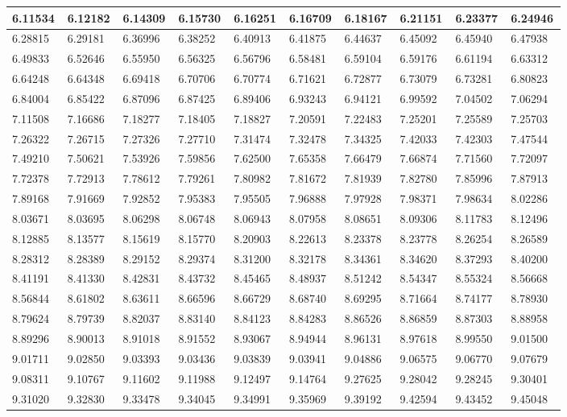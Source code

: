 \begin{changemargin}{-4cm}{0cm}\small{%
\begin{tabular}{|p{0.08\linewidth}|p{0.08\linewidth}|p{0.08\linewidth}|p{0.08\linewidth}|p{0.08\linewidth}|p{0.08\linewidth}|p{0.08\linewidth}|p{0.08\linewidth}|p{0.08\linewidth}|p{0.08\linewidth}|}%
\hline%
6.11534&6.12182&6.14309&6.15730&6.16251&6.16709&6.18167&6.21151&6.23377&6.24946\\%
\hline%
6.28815&6.29181&6.36996&6.38252&6.40913&6.41875&6.44637&6.45092&6.45940&6.47938\\%
\hline%
6.49833&6.52646&6.55950&6.56325&6.56796&6.58481&6.59104&6.59176&6.61194&6.63312\\%
\hline%
6.64248&6.64348&6.69418&6.70706&6.70774&6.71621&6.72877&6.73079&6.73281&6.80823\\%
\hline%
6.84004&6.85422&6.87096&6.87425&6.89406&6.93243&6.94121&6.99592&7.04502&7.06294\\%
\hline%
7.11508&7.16686&7.18277&7.18405&7.18827&7.20591&7.22483&7.25201&7.25589&7.25703\\%
\hline%
7.26322&7.26715&7.27326&7.27710&7.31474&7.32478&7.34325&7.42033&7.42303&7.47544\\%
\hline%
7.49210&7.50621&7.53926&7.59856&7.62500&7.65358&7.66479&7.66874&7.71560&7.72097\\%
\hline%
7.72378&7.72913&7.78612&7.79261&7.80982&7.81672&7.81939&7.82780&7.85996&7.87913\\%
\hline%
7.89168&7.91669&7.92852&7.95383&7.95505&7.96888&7.97928&7.98371&7.98634&8.02286\\%
\hline%
8.03671&8.03695&8.06298&8.06748&8.06943&8.07958&8.08651&8.09306&8.11783&8.12496\\%
\hline%
8.12885&8.13577&8.15619&8.15770&8.20903&8.22613&8.23378&8.23778&8.26254&8.26589\\%
\hline%
8.28312&8.28389&8.29152&8.29374&8.31200&8.32178&8.34361&8.34620&8.37293&8.40200\\%
\hline%
8.41191&8.41330&8.42831&8.43732&8.45465&8.48937&8.51242&8.54347&8.55324&8.56668\\%
\hline%
8.56844&8.61802&8.63611&8.66596&8.66729&8.68740&8.69295&8.71664&8.74177&8.78930\\%
\hline%
8.79624&8.79739&8.82037&8.83140&8.84123&8.84283&8.86526&8.86859&8.87303&8.88958\\%
\hline%
8.89296&8.90013&8.91018&8.91552&8.93067&8.94944&8.96131&8.97618&8.99550&9.01500\\%
\hline%
9.01711&9.02850&9.03393&9.03436&9.03839&9.03941&9.04886&9.06575&9.06770&9.07679\\%
\hline%
9.08311&9.10767&9.11602&9.11988&9.12497&9.14764&9.27625&9.28042&9.28245&9.30401\\%
\hline%
9.31020&9.32830&9.33478&9.34045&9.34991&9.35969&9.39192&9.42594&9.43452&9.45048\\%
\hline%
\end{tabular}%
\newline%
\newline%
%
}\end{changemargin}%
